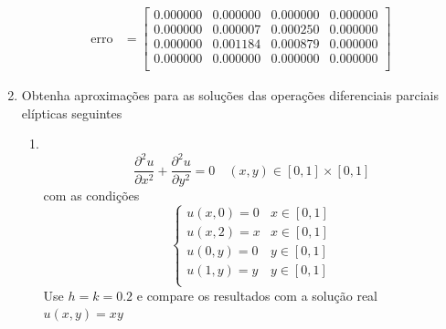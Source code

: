\documentclass[a4paper, 11pt]{report}
\begin{document}
\begin{enumerate}[leftmargin=*]
\begin{minipage}{0.6\columnwidth}
\begin{align*}
            \text{erro} &= 
            \begin{bmatrix}
                0.000000 & 0.000000 & 0.000000 & 0.000000 \\
                0.000000 & 0.000007 & 0.000250 & 0.000000 \\
                0.000000 & 0.001184 & 0.000879 & 0.000000 \\
                0.000000 & 0.000000 & 0.000000 & 0.000000 \\
            \end{bmatrix}
        \end{align*}
    \end{minipage}

    \item Obtenha aproximações para as soluções das operações diferenciais parciais elípticas seguintes
    \begin{enumerate}[leftmargin=*, label=\alph*.]
        \item ~
        \[
        \dfrac{\partial^2 u}{\partial x^2} + \dfrac{\partial^2 u}{\partial y^2} = 0 \quad (x,y) \in [0,1] \times [0,1]
        \]
        com as condições
        \[
            \left\{  
                \begin{array}{ll}
                    u(x,0) = 0 & x \in [0,1]\\  
                    u(x,2) = x & x \in [0,1]\\
                    u(0,y) = 0 & y \in [0,1]\\
                    u(1,y) = y & y \in [0,1]\\
                \end{array}
            \right.
        \]
        Use $h = k = 0.2$ e compare os resultados com a solução real $u(x,y) = xy$
        

\end{enumerate}
\end{enumerate}
\end{document}
